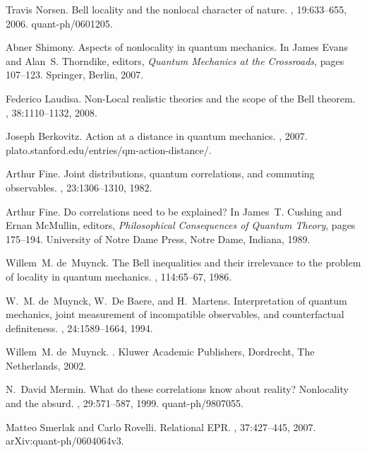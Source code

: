 \documentclass[10pt]{article} %
\begin{document}
\begin{thebibliography}{10}
Travis Norsen.
\newblock Bell locality and the nonlocal character of nature.
, 19:633--655, 2006.
\newblock quant-ph/0601205.

Abner Shimony.
\newblock Aspects of nonlocality in quantum mechanics.
\newblock In James Evans and Alan~S. Thorndike, editors, {\em Quantum Mechanics
  at the Crossroads}, pages 107--123. Springer, Berlin, 2007.

Federico Laudisa.
\newblock Non-{L}ocal realistic theories and the scope of the {B}ell theorem.
, 38:1110--1132, 2008.

Joseph Berkovitz.
\newblock Action at a distance in quantum mechanics.
, 2007.
\newblock plato.stanford.edu/entries/qm-action-distance/.

Arthur Fine.
\newblock Joint distributions, quantum correlations, and commuting observables.
, 23:1306--1310, 1982.

Arthur Fine.
\newblock Do correlations need to be explained?
\newblock In James~T. Cushing and Ernan McMullin, editors, {\em Philosophical
  Consequences of Quantum Theory}, pages 175--194. University of Notre Dame
  Press, Notre Dame, Indiana, 1989.

Willem~M. de~Muynck.
\newblock The {B}ell inequalities and their irrelevance to the problem of
  locality in quantum mechanics.
, 114:65--67, 1986.

W.~M. de~Muynck, W.~De Baere, and H.~Martens.
\newblock Interpretation of quantum mechanics, joint measurement of
  incompatible observables, and counterfactual definiteness.
, 24:1589--1664, 1994.

Willem~M. de~Muynck.
.
\newblock Kluwer Academic Publishers, Dordrecht, The Netherlands, 2002.

N.~David Mermin.
\newblock What do these correlations know about reality? {N}onlocality and the
  absurd.
, 29:571--587, 1999.
\newblock quant-ph/9807055.

Matteo Smerlak and Carlo Rovelli.
\newblock Relational {E}{P}{R}.
, 37:427--445, 2007.
\newblock arXiv:quant-ph/0604064v3.


\end{thebibliography}
\end{document}
